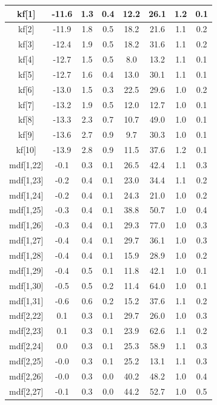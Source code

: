 \begin{longtable}{|c|c|c|c|c|c|c|c|}
kf[1] & -11.6 & 1.3 & 0.4 & 12.2 & 26.1 & 1.2 & 0.1 \\
\hline
kf[2] & -11.9 & 1.8 & 0.5 & 18.2 & 21.6 & 1.1 & 0.2 \\
\hline
kf[3] & -12.4 & 1.9 & 0.5 & 18.2 & 31.6 & 1.1 & 0.2 \\
\hline
kf[4] & -12.7 & 1.5 & 0.5 & 8.0 & 13.2 & 1.1 & 0.1 \\
\hline
kf[5] & -12.7 & 1.6 & 0.4 & 13.0 & 30.1 & 1.1 & 0.1 \\
\hline
kf[6] & -13.0 & 1.5 & 0.3 & 22.5 & 29.6 & 1.0 & 0.2 \\
\hline
kf[7] & -13.2 & 1.9 & 0.5 & 12.0 & 12.7 & 1.0 & 0.1 \\
\hline
kf[8] & -13.3 & 2.3 & 0.7 & 10.7 & 49.0 & 1.0 & 0.1 \\
\hline
kf[9] & -13.6 & 2.7 & 0.9 & 9.7 & 30.3 & 1.0 & 0.1 \\
\hline
kf[10] & -13.9 & 2.8 & 0.9 & 11.5 & 37.6 & 1.2 & 0.1 \\
\hline
mdf[1,22] & -0.1 & 0.3 & 0.1 & 26.5 & 42.4 & 1.1 & 0.3 \\
\hline
mdf[1,23] & -0.2 & 0.4 & 0.1 & 23.0 & 34.4 & 1.1 & 0.2 \\
\hline
mdf[1,24] & -0.2 & 0.4 & 0.1 & 24.3 & 21.0 & 1.0 & 0.2 \\
\hline
mdf[1,25] & -0.3 & 0.4 & 0.1 & 38.8 & 50.7 & 1.0 & 0.4 \\
\hline
mdf[1,26] & -0.3 & 0.4 & 0.1 & 29.3 & 77.0 & 1.0 & 0.3 \\
\hline
mdf[1,27] & -0.4 & 0.4 & 0.1 & 29.7 & 36.1 & 1.0 & 0.3 \\
\hline
mdf[1,28] & -0.4 & 0.4 & 0.1 & 15.9 & 28.9 & 1.0 & 0.2 \\
\hline
mdf[1,29] & -0.4 & 0.5 & 0.1 & 11.8 & 42.1 & 1.0 & 0.1 \\
\hline
mdf[1,30] & -0.5 & 0.5 & 0.2 & 11.4 & 64.0 & 1.0 & 0.1 \\
\hline
mdf[1,31] & -0.6 & 0.6 & 0.2 & 15.2 & 37.6 & 1.1 & 0.2 \\
\hline
mdf[2,22] & 0.1 & 0.3 & 0.1 & 29.7 & 26.0 & 1.0 & 0.3 \\
\hline
mdf[2,23] & 0.1 & 0.3 & 0.1 & 23.9 & 62.6 & 1.1 & 0.2 \\
\hline
mdf[2,24] & 0.0 & 0.3 & 0.1 & 25.3 & 58.9 & 1.1 & 0.3 \\
\hline
mdf[2,25] & -0.0 & 0.3 & 0.1 & 25.2 & 13.1 & 1.1 & 0.3 \\
\hline
mdf[2,26] & -0.0 & 0.3 & 0.0 & 40.2 & 48.2 & 1.0 & 0.4 \\
\hline
mdf[2,27] & -0.1 & 0.3 & 0.0 & 44.2 & 52.7 & 1.0 & 0.5 \\

\end{longtable}
